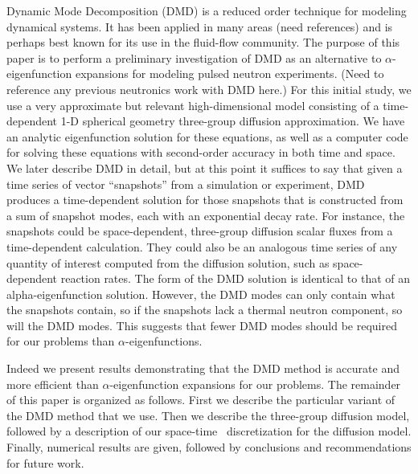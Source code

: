 \documentclass[12pt]{article}
\begin{document}
Dynamic Mode Decomposition (DMD) is a reduced order technique for modeling  dynamical systems.
It has been applied in many areas (need references) and is perhaps best known for its use in the 
	fluid-flow community.  
The purpose of this paper is to perform a preliminary investigation of DMD as an alternative to 
	$\alpha$-eigenfunction expansions for modeling pulsed neutron experiments. (Need to reference any 
	previous neutronics work with DMD here.) 
For this initial study, we use a very approximate but relevant high-dimensional model consisting of a 
	time-dependent 1-D spherical geometry three-group diffusion approximation. 
We have an analytic eigenfunction solution for these equations, as well as a computer code for solving 
	these equations with second-order accuracy in both time and space.  
We later describe DMD in detail, but at this point it suffices to say that given a time series of vector 
	``snapshots'' from a simulation or experiment, DMD produces a time-dependent solution for those 
	snapshots that is constructed from a sum of snapshot modes, each with an exponential decay rate.  
For instance, the snapshots could be space-dependent, three-group diffusion scalar fluxes from a 
	time-dependent calculation.  
They could also be an analogous time series of any quantity of interest computed from the diffusion 
	solution, such as space-dependent reaction rates.  
The form of the DMD solution is identical to that of an alpha-eigenfunction  solution.  
However, the DMD modes can only contain what the snapshots contain, so if the snapshots lack a 
	thermal neutron component, so will the DMD modes.  
This suggests that fewer DMD modes should be required for our problems than 
	$\alpha$-eigenfunctions.

Indeed we present results demonstrating that the DMD method is accurate and more efficient than 
	$\alpha$-eigenfunction expansions for our problems.  
The remainder of this paper is organized as follows.  
First we describe the particular variant of the DMD method that we use.  
Then we describe the three-group diffusion model, followed by a description of our space-time \
	discretization for the diffusion model.  
Finally, numerical results are given, followed by conclusions and   recommendations for future work.
\end{document}
